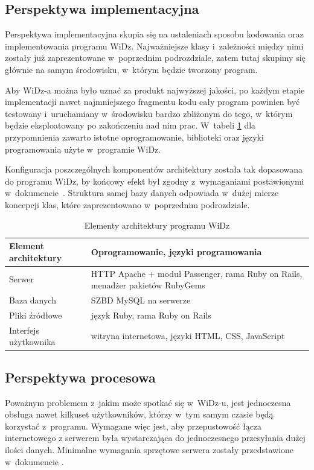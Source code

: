 \documentclass[12pt,leqno,twoside]{mwart}
\begin{document}
\subsection{Perspektywa implementacyjna}
\noindent Perspektywa implementacyjna skupia się na ustaleniach sposobu kodowania oraz implementowania programu WiDz. Najważniejsze klasy i~zależności między nimi zostały już zaprezentowane w~poprzednim podrozdziale, zatem tutaj skupimy się głównie na samym środowisku, w~którym będzie tworzony program.

\indent Aby WiDz-a można było uznać za produkt najwyższej jakości, po każdym etapie implementacji nawet najmniejszego fragmentu kodu cały program powinien być testowany i~uruchamiany w~środowisku bardzo zbliżonym do tego, w~którym będzie eksploatowany po zakończeniu nad nim prac. W~tabeli \ref{elementy_architektury} dla przypomnienia zawarto istotne oprogramowanie, biblioteki oraz języki programowania użyte w~programie WiDz.

\indent Konfiguracja poszczególnych komponentów architektury została tak dopasowana do programu WiDz, by końcowy efekt był zgodny z~wymaganiami postawionymi w~dokumencie~\cite{WYM}. Struktura samej bazy danych odpowiada w~dużej mierze koncepcji klas, które zaprezentowano w~poprzednim podrozdziale.
\begin{table}[h]
	\centering
	\caption{Elementy architektury programu WiDz}
		\begin{tabular}{|l|p{10cm}|}
		\hline
		\textbf{Element architektury} & \textbf{Oprogramowanie, języki programowania} \\ \hline
		Serwer & HTTP Apache + moduł Passenger, rama Ruby on Rails, menadżer pakietów RubyGems \\ \hline
		Baza danych & SZBD MySQL na serwerze \\ \hline
		Pliki źródłowe & język Ruby, rama Ruby on Rails \\ \hline
		Interfejs użytkownika & witryna internetowa, języki HTML, CSS, JavaScript \\ \hline
		\end{tabular}
	\label{elementy_architektury}
\end{table}

\subsection{Perspektywa procesowa}
\noindent Poważnym problemem z~jakim może spotkać się w~WiDz-u, jest jednoczesna obsługa nawet kilkuset użytkowników, którzy w~tym samym czasie będą korzystać z~programu. Wymagane więc jest, aby przepustowość łącza internetowego z serwerem była wystarczająca do jednoczesnego przesyłania dużej ilości danych. Minimalne wymagania sprzętowe serwera zostały przedstawione w~dokumencie \cite{WYM}.
\end{document}
